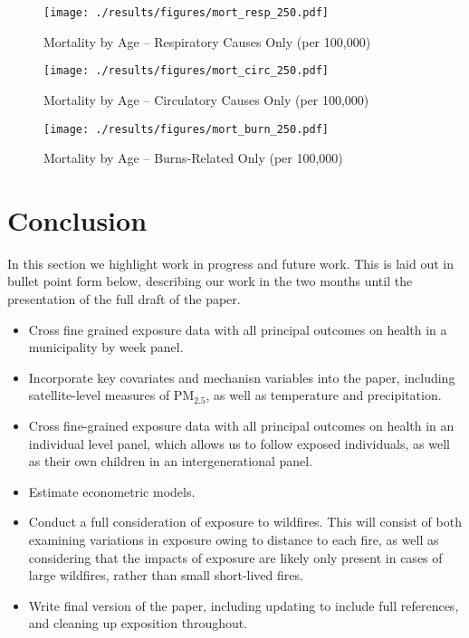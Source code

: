 \documentclass[11pt]{article}
\begin{document}
\begin{spacing}{1.3}
\begin{figure}
    \centering
    \caption{Mortality by Age -- Respiratory Causes Only (per 100,000)}
    \label{fig:mortResp}
    \texttt{[image: ./results/figures/mort\_resp\_250.pdf]}
\end{figure}

\begin{figure}
    \centering
    \caption{Mortality by Age -- Circulatory Causes Only (per 100,000)}
    \label{fig:mortCirc}
    \texttt{[image: ./results/figures/mort\_circ\_250.pdf]}
\end{figure}

\begin{figure}
    \centering
    \caption{Mortality by Age -- Burns-Related Only (per 100,000)}
    \label{fig:mortCirc}
    \texttt{[image: ./results/figures/mort\_burn\_250.pdf]}
\end{figure}

\section{Conclusion}
In this section we highlight work in progress and future work.  This is laid out in bullet point form below, describing our work in the two months until the presentation of the full draft of the paper.  
\begin{itemize}
    \item Cross fine grained exposure data with all principal outcomes on health in a municipality by week panel.
    \item Incorporate key covariates and mechanisn variables into the paper, including satellite-level measures of PM$_{2.5}$, as well as temperature and precipitation.
    \item Cross fine-grained exposure data with all principal outcomes on health in an individual level panel, which allows us to follow exposed individuals, as well as their own children in an intergenerational panel.
    \item Estimate econometric models.
    \item Conduct a full consideration of exposure to wildfires.  This will consist of both examining variations in exposure owing to distance to each fire, as well as considering that the impacts of exposure are likely only present in cases of large wildfires, rather than small short-lived fires.
    \item Write final version of the paper, including updating to include full references, and cleaning up exposition throughout.
\end{itemize}



\end{spacing}
\end{document}
